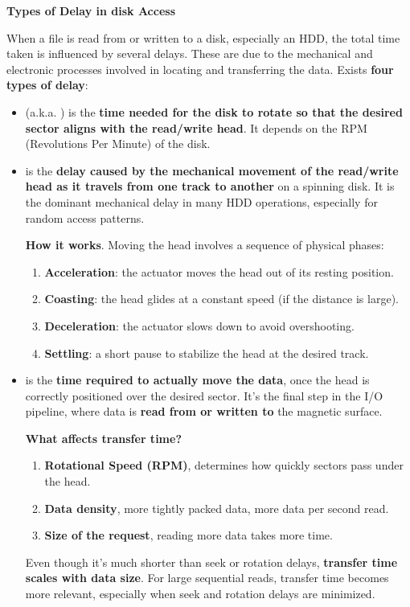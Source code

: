\highspace
\begin{flushleft}
    \textcolor{Red2}{ \textbf{Types of Delay in disk Access}}
\end{flushleft}
When a file is read from or written to a disk, especially an HDD, the total time taken is influenced by several delays. These are due to the mechanical and electronic processes involved in locating and transferring the data. Exists \textbf{four types of delay}:
\begin{itemize}\label{four types of hdd delay}
    \item {} (a.k.a. ) is the \textbf{time needed for the disk to rotate so that the desired sector aligns with the read/write head}. It depends on the RPM (Revolutions Per Minute) of the disk.


    \item {} is the \textbf{delay caused by the mechanical movement of the read/write head as it travels from one track to another} on a spinning disk. It is the dominant mechanical delay in many HDD operations, especially for random access patterns.

    \textcolor{Green3}{ \textbf{How it works}}. Moving the head involves a sequence of physical phases:
    \begin{enumerate}
        \item \textbf{Acceleration}: the actuator moves the head out of its resting position.
        \item \textbf{Coasting}: the head glides at a constant speed (if the distance is large).
        \item \textbf{Deceleration}: the actuator slows down to avoid overshooting.
        \item \textbf{Settling}: a short pause to stabilize the head at the desired track.
    \end{enumerate}

   
    \item {} is the \textbf{time required to actually move the data}, once the head is correctly positioned over the desired sector. It's the final step in the I/O pipeline, where data is \textbf{read from or written to} the magnetic surface.
    
    \textcolor{Green3}{ \textbf{What affects transfer time?}}
    \begin{enumerate}
        \item \textbf{Rotational Speed (RPM)}, determines how quickly sectors pass under the head.
        \item \textbf{Data density}, more tightly packed data, more data per second read.
        \item \textbf{Size of the request}, reading more data takes more time.
    \end{enumerate}
    Even though it's much shorter than seek or rotation delays, \textbf{transfer time scales with data size}. For large sequential reads, transfer time becomes more relevant, especially when seek and rotation delays are minimized.



\end{itemize}
